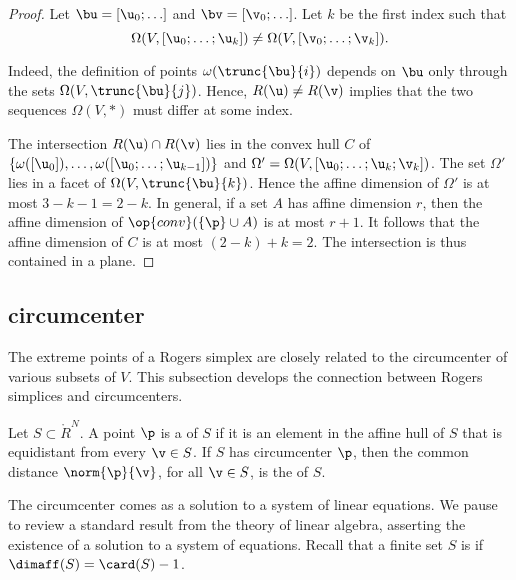 \begin{proof} Let $\bu = [\u_0;\ldots]$ and $\bv = [\v_0;\ldots]$.  
Let $k$ be the
first index such that
\begin{displaymath} 
\Omega(V,[\u_0;\ldots;\u_{k}]) \ne \Omega(V,[\v_0;\ldots;\v_{k}]).
\end{displaymath}

  Indeed, the definition of points
$\omega(\trunc{\bu}{i})$ depends on $\bu$ only through the sets
$\Omega(V,\trunc{\bu}{j})$.  Hence, $R(\u)\ne R(\v)$ implies that the
two sequences $\Omega(V,*)$ must differ at some index.

The intersection $R(\u)\cap R(\v)$ lies in the convex hull $C$ of
$\{\omega([\u_0]),\ldots,\omega( [\u_0;\ldots; \u_{k-1}])\}$ and
$\Omega'=\Omega(V,[\u_0;\ldots;\u_{k};\v_{k}])$.  The set $\Omega'$
lies in a facet of $\Omega(V,\trunc{\bu}{k})$.  Hence the affine
dimension of $\Omega'$ is at most $3-k-1=2-k$.  In general, if a set
$A$ has affine dimension $r$, then the affine dimension of
$\op{conv}(\{\p\}\cup A)$ is at most $r+1$.  It follows that the
affine dimension of $C$ is at most $(2-k)+ k = 2$.  The intersection
is thus contained in a plane.
\end{proof}


\subsection{circumcenter}

The extreme points of a Rogers simplex are closely related to the circumcenter
of various subsets of $V$.  This subsection develops the connection between
Rogers simplices and circumcenters.

\begin{definition} 
%
%
Let $S\subset\ring{R}^N$.  
A point $\p$ is a  of $S$ if it is an element
in the affine hull of $S$ that is equidistant from every $\v\in S$.  If $S$ has
circumcenter $\p$, then the common distance $\norm{\p}{\v}$, for all $\v\in S$,
is the  of  $S$.
\end{definition}

The circumcenter comes as a solution to a system of linear equations.
We pause to review a standard result from the theory of linear
algebra, asserting the existence of a solution to a system of
equations.  Recall that a finite set $S$ is  if $\dimaff(S) = \card(S) -1$.  
%
%

